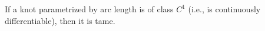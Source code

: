 If a knot parametrized by arc length is of class $C^1$ (i.e., is continuously differentiable), then it is tame.
